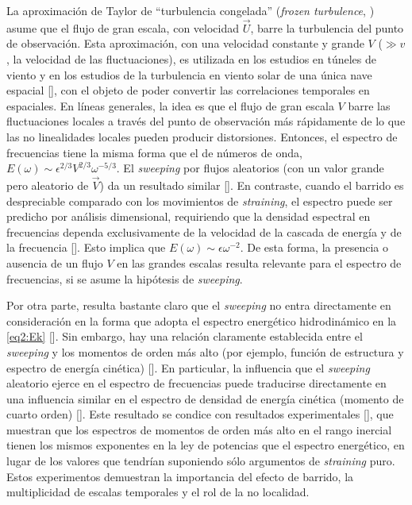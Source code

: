 La aproximación de Taylor de ``turbulencia congelada'' (\textit{frozen
turbulence}, \cite{taylor_spectrum_1938}) asume que el flujo de gran
escala, con velocidad $\vec{U}$, barre la turbulencia del punto de
observación. Esta aproximación, con una velocidad constante y grande
$V$ ($\gg v$, la velocidad de las fluctuaciones), es utilizada en los
estudios en túneles de viento y en los estudios de la turbulencia en
viento solar de una única nave espacial
[\cite{jokipii_turbulence_1973}], con el objeto de poder convertir las
correlaciones temporales en espaciales. En líneas generales, la idea
es que el flujo de gran escala $V$ barre las fluctuaciones locales a
través del punto de observación más rápidamente de lo que las no
linealidades locales pueden producir distorsiones. Entonces, el
espectro de frecuencias tiene la misma forma que el de números de
onda, $E(\omega) \sim \epsilon^{2/3} V^{2/3} \omega ^{-5/3}$. El
\textit{sweeping} por flujos aleatorios (con un valor grande pero
aleatorio de $\vec{V}$) da un resultado similar
[\cite{tennekes_eulerian_1975, chen_sweeping_1989}]. En contraste,
cuando el barrido es despreciable comparado con los movimientos de
\textit{straining}, el espectro puede ser predicho por análisis
dimensional, requiriendo que la densidad espectral en frecuencias
dependa exclusivamente de la velocidad de la cascada de energía y de
la frecuencia [\cite{tennekes_eulerian_1975, nelkin_time_1990}]. Esto
implica que $E(\omega) \sim \epsilon \omega^{-2}$. De esta forma, la
presencia o ausencia de un flujo $V$ en las grandes escalas resulta
relevante para el espectro de frecuencias, si se asume la hipótesis de
\textit{sweeping}.

Por otra parte, resulta bastante claro que el \textit{sweeping} no
entra directamente en consideración en la forma que adopta el espectro
energético hidrodinámico en la \cref{eq2:Ek}
[\cite{chapman_computational_1979}]. Sin embargo, hay una relación
claramente establecida entre el \textit{sweeping} y los momentos de
orden más alto (por ejemplo, función de estructura y espectro de
energía cinética) [\cite{nelkin_time_1990}]. En particular, la
influencia que el \textit{sweeping} aleatorio ejerce en el espectro de
frecuencias puede traducirse directamente en una influencia similar en
el espectro de densidad de energía cinética (momento de cuarto orden)
[\cite{chen_sweeping_1989}]. Este resultado se condice con resultados
experimentales [\cite{van_atta_higher-order_1975,
  zhou_non-gaussian_1993}], que muestran que los espectros de momentos
de orden más alto en el rango inercial tienen los mismos exponentes en
la ley de potencias que el espectro energético, en lugar de los
valores que tendrían suponiendo sólo argumentos de \textit{straining}
puro. Estos experimentos demuestran la importancia del efecto de
barrido, la multiplicidad de escalas temporales y el rol de la no
localidad.

